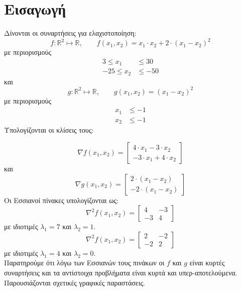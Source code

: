 \chapter{Εισαγωγή} \label{intro}

Δίνονται οι συναρτήσεις για ελαχιστοποίηση:
\begin{equation}
	\label{eq:f-definition}
	f:\mathbb{R}^{2} \mapsto \mathbb{R}, \qquad f(x_1, x_2) = x_1 \cdot x_2 + 2 \cdot (x_1 - x_2)^2
\end{equation}
με περιορισμούς
\begin{align}
	3 \leq x_1& \leq 30\\
	-25 \leq x_2& \leq -50
\end{align}
και
\begin{equation}
	\label{eq:g-definition}
	g:\mathbb{R}^{2} \mapsto \mathbb{R}, \qquad g(x_1, x_2) = (x_1 - x_2)^2
\end{equation}
με περιορισμούς
\begin{align}
	x_1& \leq -1\\
	x_2& \leq -1
\end{align}
Υπολογίζονται οι κλίσεις τους:

\begin{equation}
\nabla f(x_1, x_2) = 
\begin{bmatrix}
	4 \cdot x_1 - 3 \cdot x_2\\
	-3 \cdot x_1 + 4 \cdot x_2
\end{bmatrix}
\end{equation}
και
\begin{equation}
\nabla g(x_1, x_2) = 
\begin{bmatrix}
	2 \cdot (x_1 - x_2)\\
	-2 \cdot (x_1 - x_2)
\end{bmatrix}
\end{equation}
Οι Εσσιανοί πίνακες υπολογίζονται ως:
\begin{equation}
\nabla^2 f(x_1, x_2) = 
\begin{bmatrix}
	4 & -3\\
	-3 & 4
\end{bmatrix}
\end{equation} με ιδιοτιμές $\lambda_1 = 7$ και $\lambda_2 = 1$.
\begin{equation}
\nabla^2 f(x_1, x_2) = 
\begin{bmatrix}
	2 & -2\\
	-2 & 2
\end{bmatrix}
\end{equation} με ιδιοτιμές $\lambda_1 = 4$ και $\lambda_2 = 0$.\\
Παρατηρούμε ότι λόγω των Εσσιανών τους πινάκων οι $f$ και $g$ είναι κυρτές συναρτήσεις και τα αντίστοιχα προβλήματα είναι κυρτά και υπερ-αποτελούμενα.\\
Παρουσιάζονται σχετικές γραφικές παραστάσεις.

